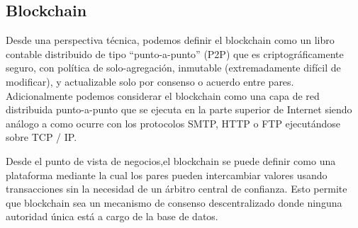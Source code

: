 \subsection{Blockchain}

Desde una perspectiva técnica, podemos definir el blockchain  como un libro contable distribuido de tipo “punto-a-punto” (P2P) que es criptográficamente seguro, con política de solo-agregación, inmutable (extremadamente difícil de modificar), y actualizable solo por consenso o acuerdo entre pares. Adicionalmente podemos  considerar el blockchain  como una capa de red distribuida punto-a-punto que se ejecuta en la parte superior de Internet siendo análogo a como ocurre con los protocolos  SMTP, HTTP o FTP ejecutándose sobre TCP / IP.\cite{bashir2017mastering}

Desde el punto de vista de negocios,el blockchain se puede definir como una plataforma mediante la cual los pares pueden intercambiar valores usando transacciones sin la necesidad de un árbitro central de confianza. Esto permite que blockchain sea un mecanismo de consenso descentralizado donde ninguna autoridad única está a cargo de la base de datos.

